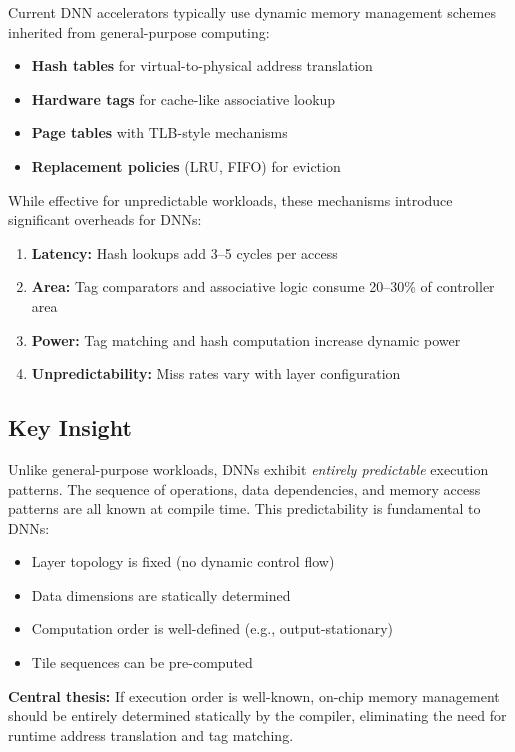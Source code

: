 \documentclass[conference]{IEEEtran}
\begin{document}
Current DNN accelerators typically use dynamic memory management schemes inherited from general-purpose computing:

\begin{itemize}
\item \textbf{Hash tables} for virtual-to-physical address translation
\item \textbf{Hardware tags} for cache-like associative lookup
\item \textbf{Page tables} with TLB-style mechanisms
\item \textbf{Replacement policies} (LRU, FIFO) for eviction
\end{itemize}

While effective for unpredictable workloads, these mechanisms introduce significant overheads for DNNs:

\begin{enumerate}
\item \textbf{Latency:} Hash lookups add 3--5 cycles per access
\item \textbf{Area:} Tag comparators and associative logic consume 20--30\% of controller area
\item \textbf{Power:} Tag matching and hash computation increase dynamic power
\item \textbf{Unpredictability:} Miss rates vary with layer configuration
\end{enumerate}

\subsection{Key Insight}

Unlike general-purpose workloads, DNNs exhibit \textit{entirely predictable} execution patterns. The sequence of operations, data dependencies, and memory access patterns are all known at compile time. This predictability is fundamental to DNNs:

\begin{itemize}
\item Layer topology is fixed (no dynamic control flow)
\item Data dimensions are statically determined
\item Computation order is well-defined (e.g., output-stationary)
\item Tile sequences can be pre-computed
\end{itemize}

\textbf{Central thesis:} If execution order is well-known, on-chip memory management should be entirely determined statically by the compiler, eliminating the need for runtime address translation and tag matching.
\end{document}
